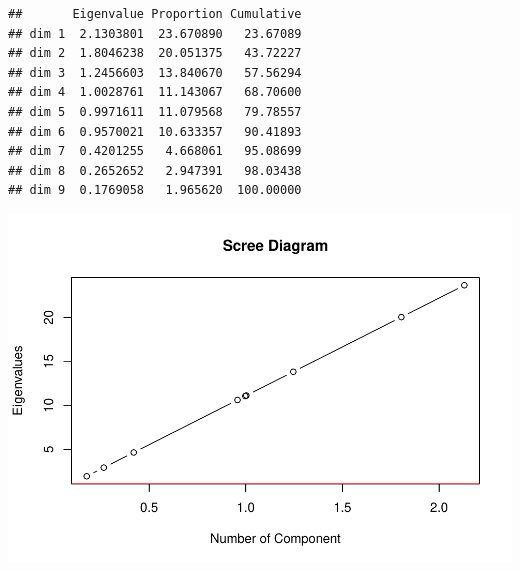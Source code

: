 \documentclass[
]{article}
\newenvironment{Shaded}{\begin{snugshade}}{\end{snugshade}}
\newcommand{\CommentTok}[1]{\textcolor[rgb]{0.56,0.35,0.01}{\textit{#1}}}
\newcommand{\DataTypeTok}[1]{\textcolor[rgb]{0.13,0.29,0.53}{#1}}
\newcommand{\DecValTok}[1]{\textcolor[rgb]{0.00,0.00,0.81}{#1}}
\newcommand{\KeywordTok}[1]{\textcolor[rgb]{0.13,0.29,0.53}{\textbf{#1}}}
\newcommand{\NormalTok}[1]{#1}
\newcommand{\OperatorTok}[1]{\textcolor[rgb]{0.81,0.36,0.00}{\textbf{#1}}}
\newcommand{\StringTok}[1]{\textcolor[rgb]{0.31,0.60,0.02}{#1}}
\begin{document}
\begin{Shaded}
\end{Shaded}

\begin{verbatim}
##       Eigenvalue Proportion Cumulative
## dim 1  2.1303801  23.670890   23.67089
## dim 2  1.8046238  20.051375   43.72227
## dim 3  1.2456603  13.840670   57.56294
## dim 4  1.0028761  11.143067   68.70600
## dim 5  0.9971611  11.079568   79.78557
## dim 6  0.9570021  10.633357   90.41893
## dim 7  0.4201255   4.668061   95.08699
## dim 8  0.2652652   2.947391   98.03438
## dim 9  0.1769058   1.965620  100.00000
\end{verbatim}

\begin{Shaded}
\end{Shaded}

\includegraphics{project-code_files/figure-latex/unnamed-chunk-26-1.pdf}
\end{document}
